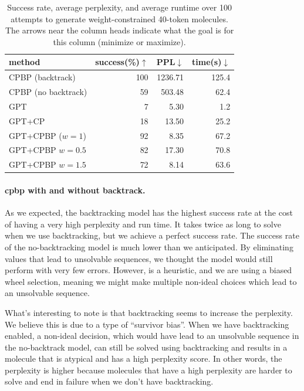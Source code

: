 \documentclass[../Document.tex]{subfiles}
\begin{document}
\begin{table}[t]
    \centering
    \begin{tabular}{l r r r}
        \hline
        method & success(\%)$\uparrow$ & PPL$\downarrow$ & time(s)$\downarrow$\\
        \hline
        CPBP (backtrack)        & 100   & 1236.71   & 125.4 \\
        CPBP (no backtrack)     & 59    & 503.48    & 62.4 \\
        GPT                     & 7     & 5.30      & 1.2 \\
        GPT+CP                  & 18    & 13.50     & 25.2 \\
        GPT+CPBP ($w=1$)        & 92    & 8.35      & 67.2 \\
        GPT+CPBP $w=0.5$        & 82    & 17.30     & 70.8 \\
        GPT+CPBP $w=1.5$        & 72    & 8.14      & 63.6 \\
        \hline
    \end{tabular}
    \caption[Success rate, average perplexity, and average runtime over 100 attempts to generate weight-constrained 40-token molecules.]{Success rate, average perplexity, and average runtime over 100 attempts to generate weight-constrained 40-token molecules. The arrows near the column heads indicate what the goal is for this column (\ie minimize or maximize).}
    \label{tab:gptcp-results}
\end{table}

\paragraph{\gls{cpbp} with and without backtrack.}
As we expected, the backtracking model has the highest success rate at the cost of having a very high perplexity and run time. It takes twice as long to solve when we use backtracking, but we achieve a perfect success rate.
The success rate of the no-backtracking model is much lower than we anticipated. By eliminating values that lead to unsolvable sequences, we thought the model would still perform with very few errors. However, \bp is a heuristic, and we are using a biased wheel selection, meaning we might make multiple non-ideal choices which lead to an unsolvable sequence.

What's interesting to note is that backtracking seems to increase the perplexity. We believe this is due to a type of ``survivor bias''. When we have backtracking enabled, a non-ideal decision, which would have lead to an unsolvable sequence in the no-backtrack model, can still be solved using backtracking and results in a molecule that is atypical and has a high perplexity score. In other words, the perplexity is higher because molecules that have a high perplexity are harder to solve and end in failure when we don't have backtracking.
\end{document}

